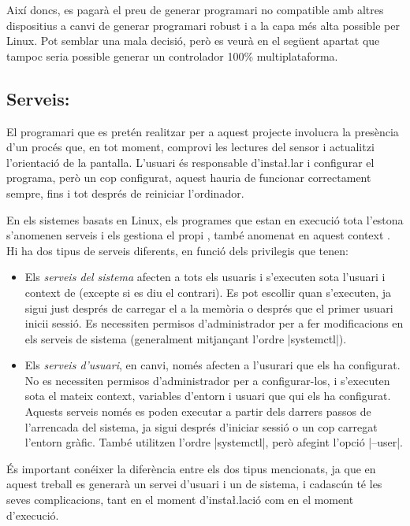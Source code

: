 Així doncs, es pagarà el preu de generar programari no compatible amb altres
dispositius a canvi de generar programari robust i a la capa més alta possible
per Linux. Pot semblar una mala decisió, però es veurà en el següent apartat
que tampoc seria possible generar un controlador 100\% multiplataforma.

\subsection{Serveis: }
\label{subsec:systemd}

El programari que es pretén realitzar per a aquest projecte involucra la
presència d'un procés que, en tot moment, comprovi les lectures del sensor i
actualitzi l'orientació de la pantalla. L'usuari és responsable d'insta\l.lar i
configurar el programa, però un cop configurat, aquest hauria de funcionar
correctament sempre, fins i tot després de reiniciar l'ordinador.

En els sistemes basats en Linux, els programes que estan en execució tota
l'estona s'anomenen serveis i els gestiona el propi , també anomenat
en aquest context  \cite{Systemd}. Hi ha dos tipus de serveis diferents, en
funció dels privilegis que tenen:

\begin{itemize}
    \item Els \emph{serveis del sistema} afecten a tots els usuaris i
    s'executen sota l'usuari i context de  (excepte si es diu
    el contrari). Es pot escollir quan s'executen, ja sigui just després de
    carregar el  a la memòria o després que el primer usuari
    inicii sessió. Es necessiten permisos d'administrador per a fer modificacions
    en els serveis de sistema (generalment mitjançant l'ordre \ord|systemctl|).
    \item Els \emph{serveis d'usuari}, en canvi, només afecten a l'usurari
    que els ha configurat. No es necessiten permisos d'administrador per a
    configurar-los, i s'executen sota el mateix context, variables d'entorn i
    usuari que qui els ha configurat. Aquests serveis només es poden executar a
    partir dels darrers passos de l'arrencada del sistema, ja sigui després
    d'iniciar sessió o un cop carregat l'entorn gràfic. També utilitzen l'ordre
    \ord|systemctl|, però afegint l'opció \ord|--user|.
\end{itemize}

És important conéixer la diferència entre els dos tipus mencionats, ja que en
aquest treball es generarà un servei d'usuari i un de sistema, i cadascún té
les seves complicacions, tant en el moment d'insta\l.lació com en el moment
d'execució.

